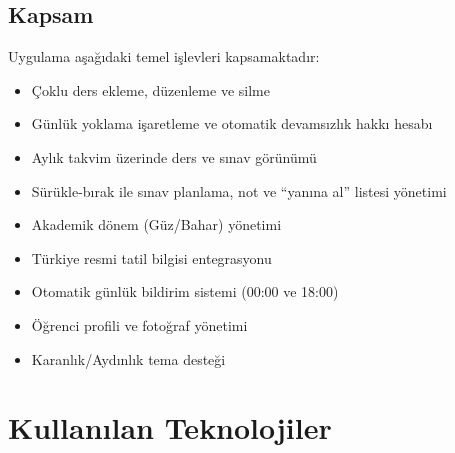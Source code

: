 \documentclass[12pt,a4paper]{article}
\begin{document}
\subsection{Kapsam}

Uygulama aşağıdaki temel işlevleri kapsamaktadır:

\begin{itemize}
    \item Çoklu ders ekleme, düzenleme ve silme
    \item Günlük yoklama işaretleme ve otomatik devamsızlık hakkı hesabı
    \item Aylık takvim üzerinde ders ve sınav görünümü
    \item Sürükle-bırak ile sınav planlama, not ve ``yanına al'' listesi yönetimi
    \item Akademik dönem (Güz/Bahar) yönetimi
    \item Türkiye resmi tatil bilgisi entegrasyonu
    \item Otomatik günlük bildirim sistemi (00:00 ve 18:00)
    \item Öğrenci profili ve fotoğraf yönetimi
    \item Karanlık/Aydınlık tema desteği
\end{itemize}

\section{Kullanılan Teknolojiler}
\end{document}
